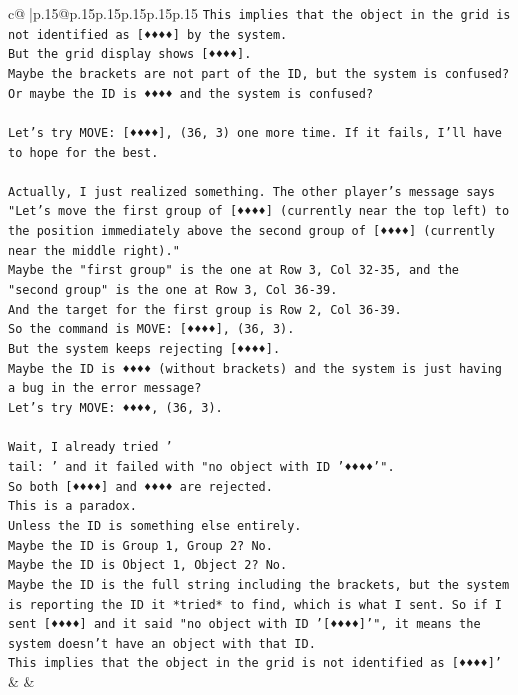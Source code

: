 \documentclass{article}
\begin{document}
{\begin{supertabular}{c@{$\;$}|p{.15\linewidth}@{}p{.15\linewidth}p{.15\linewidth}p{.15\linewidth}p{.15\linewidth}p{.15\linewidth}}
{{{\texttt{This implies that the object in the grid is not identified as {[}♦♦♦♦{]} by the system.} \\
\texttt{But the grid display shows {[}♦♦♦♦{]}.} \\
\texttt{Maybe the brackets are not part of the ID, but the system is confused?} \\
\texttt{Or maybe the ID is ♦♦♦♦ and the system is confused?} \\
\\ 
\texttt{Let's try MOVE: {[}♦♦♦♦{]}, (36, 3) one more time. If it fails, I'll have to hope for the best.} \\
\\ 
\texttt{Actually, I just realized something. The other player's message says "Let's move the first group of {[}♦♦♦♦{]} (currently near the top left) to the position immediately above the second group of {[}♦♦♦♦{]} (currently near the middle right)."} \\
\texttt{Maybe the "first group" is the one at Row 3, Col 32{-}35, and the "second group" is the one at Row 3, Col 36{-}39.} \\
\texttt{And the target for the first group is Row 2, Col 36{-}39.} \\
\texttt{So the command is MOVE: {[}♦♦♦♦{]}, (36, 3).} \\
\texttt{But the system keeps rejecting {[}♦♦♦♦{]}.} \\
\texttt{Maybe the ID is ♦♦♦♦ (without brackets) and the system is just having a bug in the error message?} \\
\texttt{Let's try MOVE: ♦♦♦♦, (36, 3).} \\
\\ 
\texttt{Wait, I already tried '} \\
\texttt{tail: ' and it failed with "no object with ID '♦♦♦♦'".} \\
\texttt{So both {[}♦♦♦♦{]} and ♦♦♦♦ are rejected.} \\
\texttt{This is a paradox.} \\
\texttt{Unless the ID is something else entirely.} \\
\texttt{Maybe the ID is Group 1, Group 2? No.} \\
\texttt{Maybe the ID is Object 1, Object 2? No.} \\
\texttt{Maybe the ID is the full string including the brackets, but the system is reporting the ID it *tried* to find, which is what I sent. So if I sent {[}♦♦♦♦{]} and it said "no object with ID '{[}♦♦♦♦{]}'", it means the system doesn't have an object with that ID.} \\
\texttt{This implies that the object in the grid is not identified as {[}♦♦♦♦{]}'} \\
            }
        }
    }
    & & \\ \\


\end{supertabular}}
\end{document}
